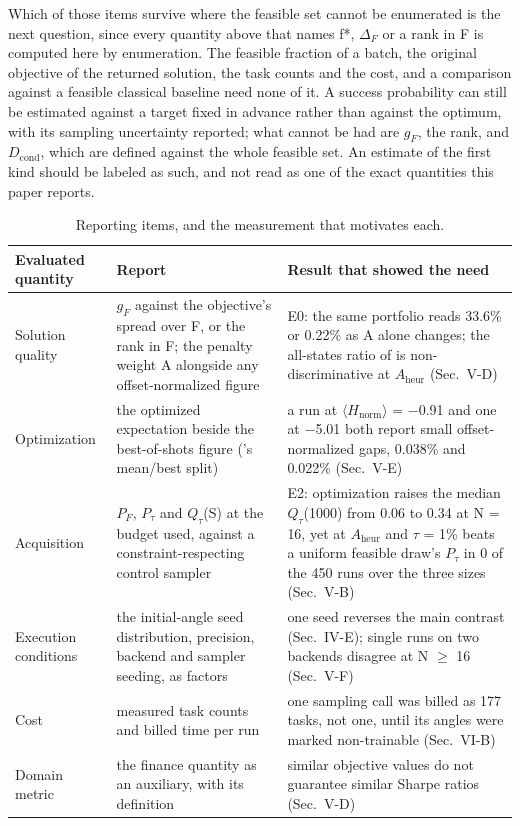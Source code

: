 \documentclass{ieeeaccess}
\begin{document}
Which of those items survive where the feasible set cannot be enumerated is the next question, since every quantity above that names f*, $\Delta_{F}$ or a rank in F is computed here by enumeration. The feasible fraction of a batch, the original objective of the returned solution, the task counts and the cost, and a comparison against a feasible classical baseline need none of it. A success probability can still be estimated against a target fixed in advance rather than against the optimum, with its sampling uncertainty reported; what cannot be had are $g_{F}$, the rank, and $D_{\mathrm{cond}}$, which are defined against the whole feasible set. An estimate of the first kind should be labeled as such, and not read as one of the exact quantities this paper reports.





\begin{table}[!t]
\centering
\scriptsize
\caption{Reporting items, and the measurement that motivates each.}
\label{tab:V}
\begin{tabular}{p{}p{}p{}}
\toprule
Evaluated quantity & Report & Result that showed the need \\
\midrule
Solution quality & $g_{F}$ against the objective's spread over F, or the rank in F; the penalty weight A alongside any offset-normalized figure & E0: the same portfolio reads 33.6\% or 0.22\% as A alone changes; the all-states ratio of \cite{ref22} is non-discriminative at $A_{\mathrm{heur}}$ (Sec.~V-D) \\
Optimization & the optimized expectation beside the best-of-shots figure (\cite{ref22}'s mean/best split) & a run at $\langle$$H_{\mathrm{norm}}$$\rangle$ = $-$0.91 and one at $-$5.01 both report small offset-normalized gaps, 0.038\% and 0.022\% (Sec.~V-E) \\
Acquisition & $P_{F}$, $P_{\tau}$ and $Q_{\tau}$(S) at the budget used, against a constraint-respecting control sampler & E2: optimization raises the median $Q_{\tau}$(1000) from 0.06 to 0.34 at N = 16, yet at $A_{\mathrm{heur}}$ and $\tau$ = 1\% beats a uniform feasible draw's $P_{\tau}$ in 0 of the 450 runs over the three sizes (Sec.~V-B) \\
Execution conditions & the initial-angle seed distribution, precision, backend and sampler seeding, as factors & one seed reverses the main contrast (Sec.~IV-E); single runs on two backends disagree at N $\geq$ 16 (Sec.~V-F) \\
Cost & measured task counts and billed time per run & one sampling call was billed as 177 tasks, not one, until its angles were marked non-trainable (Sec.~VI-B) \\
Domain metric & the finance quantity as an auxiliary, with its definition & similar objective values do not guarantee similar Sharpe ratios (Sec.~V-D) \\
\bottomrule
\end{tabular}
\end{table}
\end{document}

